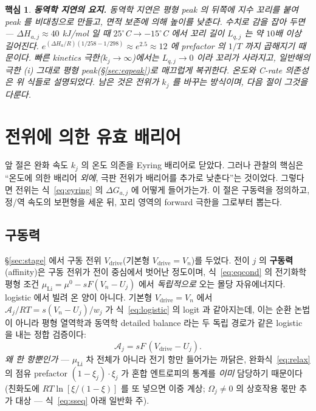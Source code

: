 \documentclass[11pt,a4paper]{article}
\newtheorem*{keybox}{핵심}
\newcommand{\drive}{\mathrm{drive}}
\begin{document}
\begin{keybox}
\textbf{동역학 지연의 요지.} 동역학 지연은 평형 peak 의 뒤쪽에 지수 꼬리를 붙여 peak 를 비대칭으로 만들고,
면적 보존에 의해 높이를 낮춘다. 수치로 감을 잡아 두면 — $\Delta H_{a,j}\approx40$ kJ/mol 일 때
$25^\circ$C$\to-15^\circ$C 에서 꼬리 길이 $L_{q,j}$ 는 약 $10$배 이상 길어진다.
$e^{(\Delta H_a/R)(1/258-1/298)}\approx e^{2.5}\approx12$ 에 prefactor 의 $1/T$ 까지 곱해지기 때문이다.
빠른 kinetics 극한($k_j\to\infty$)에서는 $L_{q,j}\to0$ 이라 꼬리가 사라지고, 일반해의 극한 (i) 그대로 평형
peak(\S\ref{sec:eqpeak})로 매끄럽게 복귀한다. 온도와 C-rate 의존성은 위 식들로 설명되었다. 남은 것은 전위가
$k_j$ 를 바꾸는 방식이며, 다음 절이 그것을 다룬다.
\end{keybox}

\section{전위에 의한 유효 배리어}\label{sec:barrier}
앞 절은 완화 속도 $k_j$ 의 온도 의존을 Eyring 배리어로 닫았다. 그러나 관찰의 핵심은 ``온도에 의한 배리어
\emph{외에}, 극판 전위가 배리어를 추가로 낮춘다''는 것이었다. 그렇다면 전위는 식~\eqref{eq:eyring} 의
$\Delta G_{a,j}$ 에 어떻게 들어가는가. 이 절은 구동력을 정의하고, 정/역 속도의 보편형을 세운 뒤, 꼬리 영역의
forward 극한을 그로부터 뽑는다.

\subsection{구동력}
\S\ref{sec:stage} 에서 구동 전위 $V_\drive$(기본형 $V_\drive=V_n$)를 두었다. 전이 $j$ 의 \textbf{구동력}
(affinity)은 구동 전위가 전이 중심에서 벗어난 정도이며, 식~\eqref{eq:eqcond} 의 전기화학 평형 조건
$\mu_\mathrm{Li}=\mu^0-sF(V_n-U_j)$ 에서 \emph{독립적으로} 오는 몰당 자유에너지다. logistic 에서 빌려 온 양이
아니다. 기본형 $V_\drive=V_n$ 에서 $\mathcal A_j/RT=s(V_n-U_j)/w_j$ 가 식~\eqref{eq:logistic} 의 logit 과
같아지는데, 이는 순환 논법이 아니라 평형 열역학과 동역학 detailed balance 라는 두 독립 경로가 같은 logistic 을
내는 정합 검증이다:
\begin{equation}
\mathcal A_j=sF\,(V_\drive-U_j).
\label{eq:affinity}
\end{equation}
\emph{왜 한 항뿐인가} — $\mu_\mathrm{Li}$ 차 전체가 아니라 전기 항만 들어가는 까닭은, 완화식~\eqref{eq:relax} 의
점유 prefactor $(1-\xi_j)\cdot\xi_j$ 가 혼합 엔트로피의 통계를 \emph{이미} 담당하기 때문이다(친화도에
$RT\ln[\xi/(1-\xi)]$ 를 또 넣으면 이중 계상; $\Omega_j\ne0$ 의 상호작용 몫만 추가 대상 — 식~\eqref{eq:sseq} 아래
일반화 주).
\end{document}
